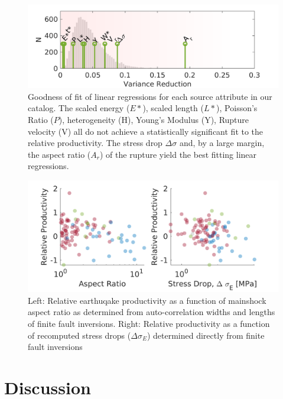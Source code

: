 \documentclass[12pt, notitlepage]{report}
\begin{document}
\begin{figure}
    \centering
    \includegraphics{figures/r2stems.png}
    \caption{Goodness of fit of linear regressions for each source attribute in our catalog. The scaled energy ($E*$), scaled length ($L*$), Poisson's Ratio ($P$), heterogeneity (H), Young's Modulus (Y), Rupture velocity (V) all do not achieve a statistically significant fit to the relative productivity. The stress drop $\Delta \sigma$ and, by a large margin, the aspect ratio ($A_r$) of the rupture yield the best fitting linear regressions.}
    \label{fig:r2_finite_fault}
\end{figure}

\begin{figure}
    \centering
    \includegraphics{figures/prod_vs_aspect.png}
    \caption{Left: Relative earthuqake productivity as a function of mainshock aspect ratio as determined from auto-correlation widths and lengths of finite fault inversions\cite{Hayes2017}. Right: Relative productivity as a function of recomputed stress drops ($\Delta \sigma_E$) determined directly from finite fault inversions}
    \label{fig:aspect}
\end{figure}

\section{Discussion}


\end{document}
